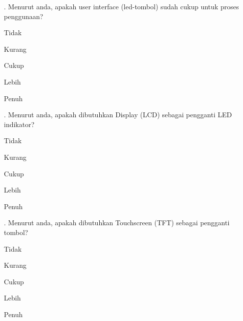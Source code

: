 \documentclass[12pt,]{article}
\begin{document}
	\vspace*{10pt}
	
	. Menurut anda, apakah user interface (led-tombol) sudah cukup untuk proses penggunaan?\\
	\begin{itemize*}
		\item Tidak \hspace*{25pt}
		\item Kurang \hspace*{25pt}
		\item Cukup \hspace*{25pt}
		\item Lebih \hspace*{25pt}
		\item Penuh \hspace*{25pt}
	\end{itemize*}
	
	\vspace*{10pt}
	
	. Menurut anda, apakah dibutuhkan Display (LCD) sebagai pengganti LED indikator?\\
	\begin{itemize*}
		\item Tidak \hspace*{25pt}
		\item Kurang \hspace*{25pt}
		\item Cukup \hspace*{25pt}
		\item Lebih \hspace*{25pt}
		\item Penuh \hspace*{25pt}
	\end{itemize*}
	
	\vspace*{10pt}
	
	. Menurut anda, apakah dibutuhkan Touchscreen (TFT) sebagai pengganti tombol?\\
	\begin{itemize*}
		\item Tidak \hspace*{25pt}
		\item Kurang \hspace*{25pt}
		\item Cukup \hspace*{25pt}
		\item Lebih \hspace*{25pt}
		\item Penuh \hspace*{25pt}
	\end{itemize*}
\end{document}
